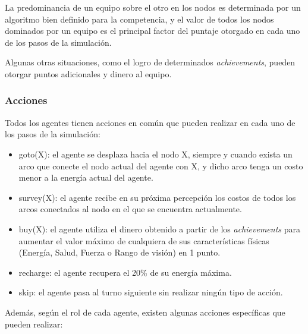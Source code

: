La predominancia de un
equipo sobre el otro en los nodos es determinada por un algoritmo bien
definido para la competencia, y el valor de todos los nodos dominados
por un equipo es el principal factor del puntaje otorgado en cada uno
de los pasos de la simulación. 

Algunas otras situaciones, como el
logro de determinados \textit{achievements}, pueden otorgar puntos
adicionales y dinero al equipo.


\subsubsection{Acciones}
\label{sec:acciones}


Todos los agentes tienen acciones en común que pueden realizar en cada
uno de los pasos de la simulación:

\begin{itemize}

\item goto(X): el agente se desplaza hacia el nodo X, siempre y cuando
exista un arco que conecte el nodo actual del agente con X, y dicho
arco tenga un costo menor a la energía actual del agente.

\item survey(X): el agente recibe en su próxima percepción los costos
de todos los arcos conectados al nodo en el que se encuentra
actualmente.

\item buy(X): el agente utiliza el dinero obtenido a partir de los
\textit{achievements} para aumentar el valor máximo de cualquiera de
sus características físicas (Energía, Salud, Fuerza o Rango de visión)
en 1 punto.

\item recharge: el agente recupera el 20\% de su energía máxima.

\item skip: el agente pasa al turno siguiente sin realizar ningún tipo
de acción.

\end{itemize}

Además, según el rol de cada agente, existen algunas acciones
específicas que pueden realizar:

